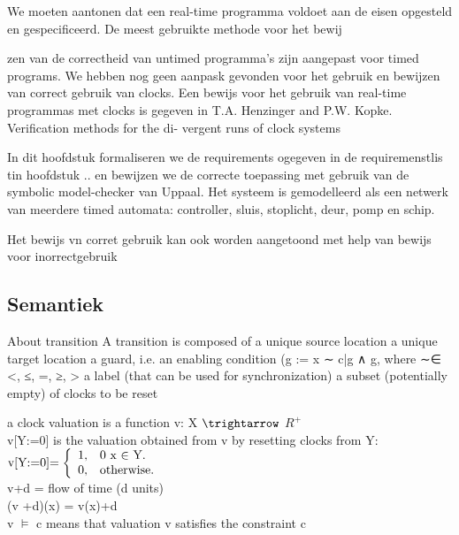  We moeten aantonen dat een real-time programma voldoet aan de eisen opgesteld en gespecificeerd. De meest gebruikte methode voor het bewij
 
 zen van de correctheid van untimed programma's zijn aangepast voor timed programs.  We hebben nog geen aanpask gevonden voor het gebruik en bewijzen van correct gebruik van clocks.  Een bewijs voor het gebruik van real-time programmas met clocks is gegeven in T.A. Henzinger and P.W. Kopke. Verification methods for the di-
 vergent runs of clock systems
 
 In dit hoofdstuk formaliseren we de requirements ogegeven in de requiremenstlis tin hoofdstuk .. en bewijzen we de correcte toepassing met gebruik van de symbolic model-checker van Uppaal.
 Het systeem is gemodelleerd als een netwerk van meerdere timed automata: controller, sluis, stoplicht, deur, pomp en schip.
 
 Het bewijs vn corret gebruik kan ook worden aangetoond met help van bewijs voor inorrectgebruik
 
 
 
\subsection{Semantiek}


About transition
A transition is composed of
a unique source location
a unique target location
a guard, i.e. an enabling condition (g := x ∼ c|g ∧ g, where
∼∈ {<, ≤, =, ≥, >}
a label (that can be used for synchronization)
a subset (potentially empty) of clocks to be reset

a clock valuation is a function v: X $\trightarrow$ $R^+$ \\
v[Y:=0] is the valuation obtained from v by resetting clocks from Y:  \\

\begin{math}
	$v[Y:=0]$=\left\{
	\begin{array}{ll}
		1, & \mbox{0 x $\in$ Y}.\\
		0, & \mbox{otherwise}.
	\end{array}
	\right.
\end{math}
\\

v+d = flow of time (d units) \\
(v +d)(x) = v(x)+d  \\
v $\models$ c means that valuation v satisfies the constraint c

